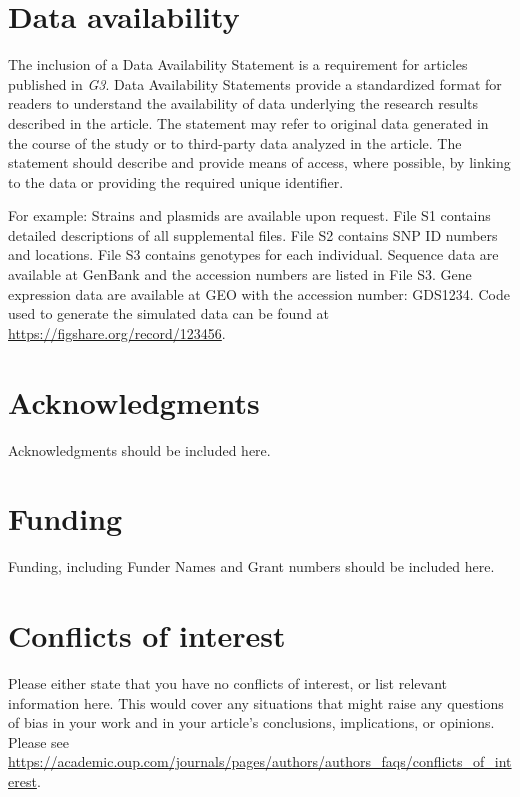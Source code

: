 \documentclass[9pt,twocolumn,twoside,lineno]{gsag3jnl}
\begin{document}
\section{Data availability}

The inclusion of a Data Availability Statement is a requirement for articles published in \textit{G3}. Data Availability Statements provide a standardized format for readers to understand the availability of data underlying the research results described in the article. The statement may refer to original data generated in the course of the study or to third-party data analyzed in the article. The statement should describe and provide means of access, where possible, by linking to the data or providing the required unique identifier.

For example: Strains and plasmids are available upon request. File S1 contains detailed descriptions of all supplemental files. File S2 contains SNP ID numbers and locations. File S3 contains genotypes for each individual. Sequence data are available at GenBank and the accession numbers are listed in File S3. Gene expression data are available at GEO with the accession number: GDS1234. Code used to generate the simulated data can be found at \url{https://figshare.org/record/123456}.

\section{Acknowledgments}
Acknowledgments should be included here.

\section{Funding}
Funding, including Funder Names and Grant numbers should be included here.

\section{Conflicts of interest}
Please either state that you have no conflicts of interest, or list relevant information here.  This would cover any situations that might raise any questions of bias in your work and in your article’s conclusions, implications, or opinions. Please see \url{https://academic.oup.com/journals/pages/authors/authors_faqs/conflicts_of_interest}.


\end{document}
